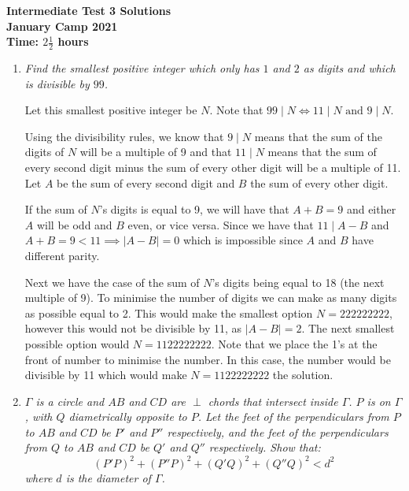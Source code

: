 \documentclass{article}
\begin{document}
\thispagestyle{empty}

\begin{center}
  \textbf{\Large Intermediate Test 3 Solutions}
  \\ \vspace{1em}
  \textbf{\large January Camp 2021}
  \\ \vspace{1em}
  \textbf{\large Time: $2\frac{1}{2}$ hours}
\end{center}

\vspace{24pt}

\begin{enumerate}[1.]

\item %
{\itshape Find the smallest positive integer which only has $1$ and $2$ as digits and which is divisible by $99$.}

Let this smallest positive integer be $N$. Note that $99 \mid N \iff 11 \mid N  \textrm{ and } 9 \mid N$. \par
Using the divisibility rules, we know that $9 \mid N$ means that the sum of the digits of $N$ will be a multiple of 9 
and that $11 \mid N$ means that the sum of every second digit minus the sum of every other digit will be a multiple of 11.
Let $A$ be the sum of every second digit and $B$ the sum of every other digit. \par
If the sum of $N$'s digits is equal to 9, we will have that $A + B = 9$ and either $A$ will be odd and $B$ even, or vice versa.
Since we have that $11 \mid A - B$ and $A + B = 9 < 11 \implies \mid A - B\mid = 0$ which is impossible since $A$ and $B$ have different parity. \par
Next we have the case of the sum of $N$'s digits being equal to 18 (the next multiple of 9). To minimise the number of digits we can make as many digits as possible equal to 2.
This would make the smallest option $N = 222222222$, however this would not be divisible by 11, as $\mid A - B\mid = 2$.
The next smallest possible option would $N = 1122222222$. Note that we place the 1's at the front of number to minimise the number.
In this case, the number would be divisible by 11 which would make $N = 1122222222$ the solution. 

\item %
{\itshape ${\Gamma}$ is a circle and ${AB}$ and ${CD}$ are ${\perp}$ chords that intersect inside ${\Gamma}$. ${P}$ is on ${\Gamma}$, with ${Q}$ diametrically opposite to ${P}$. Let the feet of the perpendiculars from ${P}$ to ${AB}$ and ${CD}$ be ${P'}$ and ${P''}$ respectively, and the feet of the perpendiculars from ${Q}$ to ${AB}$ and ${CD}$ be ${Q'}$ and ${Q''}$ respectively. Show that: $${ (P'P)^2+(P''P)^2+(Q'Q)^2+(Q''Q)^2 < d^2}$$ where ${d}$ is the diameter of ${\Gamma}$.}


\end{enumerate}
\end{document}
